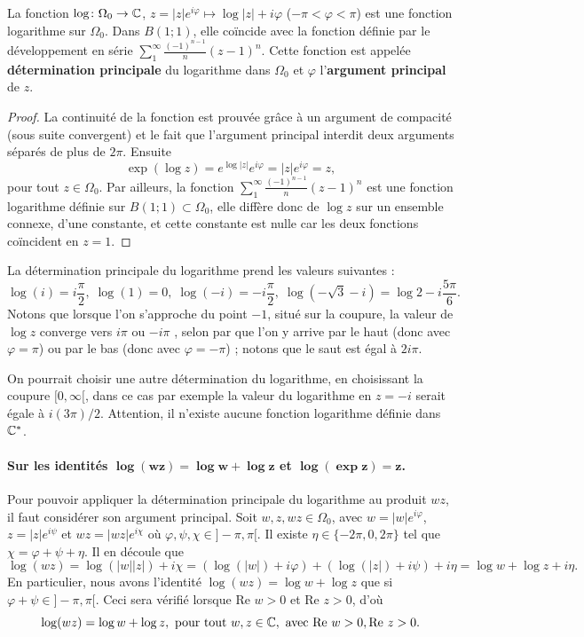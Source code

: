 \begin{fprop}
La fonction $\log \colon  \Omega_0 \to \mathbb{C}$, $z=\lvert z\rvert e^{i  \varphi} \mapsto \log \lvert z\rvert + i \varphi$ ($-\pi< \varphi < \pi$) est une fonction logarithme sur $\Omega_0$. Dans $B(1 ; 1)$, elle coïncide avec la fonction définie par le développement en série $\sum_1^\infty \frac{(-1)^{n-1}}{n}(z-1)^n$. Cette fonction est appelée \textbf{détermination principale} du logarithme dans $\Omega_0$ et $\varphi$ l'\textbf{argument principal} de $z$.
\end{fprop}
\begin{proof}
La continuité de la fonction est prouvée grâce à un argument de compacité (sous suite convergent) et le fait que l'argument principal interdit deux arguments séparés de plus de $2 \pi$. Ensuite
\[\exp(\log z)=e^{\log \lvert z \rvert} e^{i \varphi}=  \lvert z \rvert e^{i \varphi}=z,\]
pour tout $z\in \Omega_0$. Par ailleurs, la fonction $\sum_1^\infty \frac{(-1)^{n-1}}{n}(z-1)^n$ est une fonction logarithme définie sur $B(1;1)\subset \Omega_0$, elle diffère donc de $\log z$ sur un ensemble connexe, d'une constante, et cette constante est nulle car les deux fonctions coïncident en $z=1$.  
\end{proof}


La détermination principale du logarithme prend les valeurs suivantes :
\[\log (i)=i \frac{\pi}{2}, \; \log (1)=0,\; \log(-i)=-i \frac{\pi}{2},\; \log(-\sqrt{3} -i)=\log 2 -i\frac{5 \pi}{6}.\]
Notons que lorsque l'on s'approche du point $-1$, situé sur la coupure, la valeur de $\log z$ converge vers $i \pi$ ou $-i \pi$ , selon par que l'on y arrive par le \og haut \fg{} (donc avec $\varphi=\pi$) ou par le \og bas \fg{} (donc avec $\varphi=-\pi$) ; notons que le saut est égal à $2 i \pi$.

On pourrait choisir une autre détermination du logarithme, en choisissant la coupure $[0,\infty[$, dans ce cas par exemple la valeur du logarithme en $z=-i$ serait égale à $i (3 \pi)/2$. Attention, il n'existe aucune fonction logarithme définie dans $\mathbb{C}^\ast$. 


\paragraph{Sur les identités $\boldsymbol{\log(w z)=\log w + \log z}$ et $\boldsymbol{\log(\exp z)=z}$.} Pour pouvoir appliquer la détermination principale du logarithme au produit $w z$, il faut considérer son argument principal. Soit $w, z, w z \in \Omega_0$, avec $w=\lvert w \rvert e^{i \varphi}$, $z = \lvert z \rvert e^{i \psi}$ et $w z =\lvert w z \rvert e^{i \chi}$ où $\varphi, \psi, \chi \in ]-\pi, \pi[$. Il existe $\eta \in \{-2 \pi, 0, 2\pi \}$ tel que $\chi=\varphi + \psi + \eta$. Il en découle que
\[\log(w z) = \log (\lvert w \rvert\lvert z \rvert) + i \chi =  (\log (\lvert w \rvert) + i \varphi) + (\log (\lvert z \rvert) + i \psi) + i\eta = \log w + \log z + i\eta.\]
En particulier, nous avons l'identité $\log(w z)=\log w + \log z$ que si $\varphi + \psi \in ]-\pi, \pi[.$ Ceci sera vérifié lorsque $\text{Re } w>0$ et $\text{Re } z>0$, d'où
\[\log(w z)=\log w + \log z, \text{ pour tout } w, z \in \mathbb{C}, \text{ avec } \text{Re } w>0, \text{Re } z>0.\]

